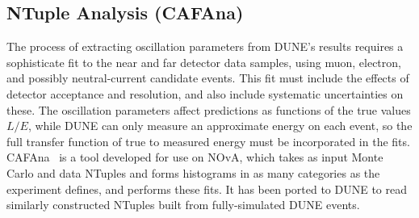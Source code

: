 \subsection{NTuple Analysis (CAFAna)}

The process of extracting oscillation parameters from DUNE's results requires a sophisticate fit to the near
and far detector data samples, using muon, electron, and possibly neutral-current candidate events.  This fit
must include the effects of detector acceptance and resolution, and also include systematic uncertainties on these.
The oscillation parameters affect predictions as functions of the true values $L/E$, while DUNE can only
measure an approximate energy on each event, so the full transfer function of true to measured energy must be
incorporated in the fits.  CAFAna~\cite{CAFAna} is a tool developed for use on NOvA, which takes as input
Monte Carlo and data NTuples and forms histograms in as many categories as the experiment defines, and performs
these fits.  It has been ported to DUNE to read similarly constructed NTuples built from fully-simulated
DUNE events.

